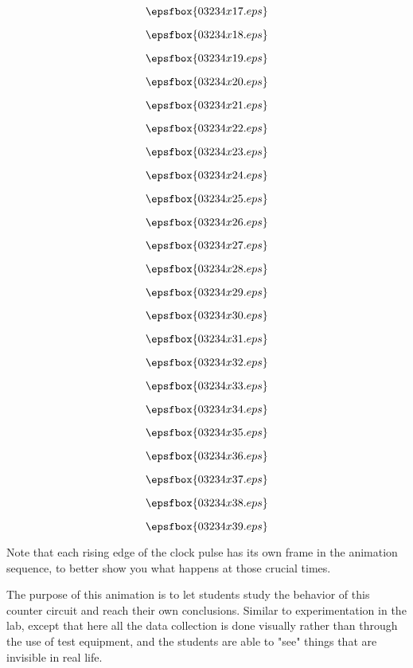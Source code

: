 \vfil \eject
$$\epsfbox{03234x17.eps}$$

\vfil \eject
$$\epsfbox{03234x18.eps}$$

\vfil \eject
$$\epsfbox{03234x19.eps}$$

\vfil \eject
$$\epsfbox{03234x20.eps}$$

\vfil \eject
$$\epsfbox{03234x21.eps}$$

\vfil \eject
$$\epsfbox{03234x22.eps}$$

\vfil \eject
$$\epsfbox{03234x23.eps}$$

\vfil \eject
$$\epsfbox{03234x24.eps}$$

\vfil \eject
$$\epsfbox{03234x25.eps}$$

\vfil \eject
$$\epsfbox{03234x26.eps}$$

\vfil \eject
$$\epsfbox{03234x27.eps}$$

\vfil \eject
$$\epsfbox{03234x28.eps}$$

\vfil \eject
$$\epsfbox{03234x29.eps}$$

\vfil \eject
$$\epsfbox{03234x30.eps}$$

\vfil \eject
$$\epsfbox{03234x31.eps}$$

\vfil \eject
$$\epsfbox{03234x32.eps}$$

\vfil \eject
$$\epsfbox{03234x33.eps}$$

\vfil \eject
$$\epsfbox{03234x34.eps}$$

\vfil \eject
$$\epsfbox{03234x35.eps}$$

\vfil \eject
$$\epsfbox{03234x36.eps}$$

\vfil \eject
$$\epsfbox{03234x37.eps}$$

\vfil \eject
$$\epsfbox{03234x38.eps}$$

\vfil \eject
$$\epsfbox{03234x39.eps}$$


\vfil \eject







Note that each rising edge of the clock pulse has its own frame in the animation sequence, to better show you what happens at those crucial times.







The purpose of this animation is to let students study the behavior of this counter circuit and reach their own conclusions.  Similar to experimentation in the lab, except that here all the data collection is done visually rather than through the use of test equipment, and the students are able to "see" things that are invisible in real life.

